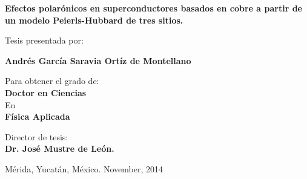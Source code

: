 \bs\bs\bs\bs
\begin{center}
  {\large \bf \bs \bf 
    \hspace{-2.8cm}
    \textsf{Efectos polarónicos en superconductores basados en cobre a partir de un modelo Peierls-Hubbard de tres sitios.}}
\end{center}
\bs\bs\bs
\begin{center}
  {\large 
    \hspace{-2.8cm}
    \textsf{Tesis presentada por:}}
\end{center}
\bs\bs
\begin{center}
  {\large \bf 
    \hspace{-2.8cm}
    \textsf{Andrés García Saravia Ortíz de Montellano}} 
\end{center}
\bs
\begin{center} 
  {\large 
    \hspace{-2.8cm}
    \textsf{Para obtener el grado de:}} \\ 
  \bs \smallskip 
  {\large \bf 
    \hspace{-2.8cm}
    \textsf{Doctor en Ciencias}}\\ 
  \bs 
  {\large 
    \hspace{-2.8cm}
    \textsf{En}} \\
  \bs
  {\bf \large 
    \hspace{-2.8cm}
    \textsf{Física Aplicada}}
\end{center}
\bs\bs\bs
\begin{center}
  \large{\hspace{-2.8cm}
    \textsf{Director de tesis: \\
      \smallskip 
      \hspace{-2.8cm}
      \textbf{Dr. José Mustre de León.}}} \\
\end{center}
\bs\bs\bs\bs\bs\bs\bs
\begin{center}
  {\large 
    \hspace{-2.8cm}
    \textsf{Mérida, Yucatán, México.
      \hspace{5.3cm} November, 2014}}
\end{center}
